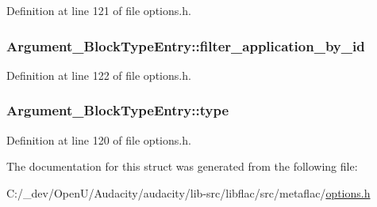 Definition at line 121 of file options.\+h.

\subsubsection[{\texorpdfstring{filter\+\_\+application\+\_\+by\+\_\+id}{filter_application_by_id}}]{ Argument\+\_\+\+Block\+Type\+Entry\+::filter\+\_\+application\+\_\+by\+\_\+id}\hypertarget{struct_argument___block_type_entry_a2f5545e19f56a9e4418a88ad112044fd}{}\label{struct_argument___block_type_entry_a2f5545e19f56a9e4418a88ad112044fd}


Definition at line 122 of file options.\+h.

\subsubsection[{\texorpdfstring{type}{type}}]{ Argument\+\_\+\+Block\+Type\+Entry\+::type}\hypertarget{struct_argument___block_type_entry_ad3ff44029f5edfa7acc20616b7e1a9a0}{}\label{struct_argument___block_type_entry_ad3ff44029f5edfa7acc20616b7e1a9a0}


Definition at line 120 of file options.\+h.



The documentation for this struct was generated from the following file\+:\begin{DoxyCompactItemize}
\item 
C\+:/\+\_\+dev/\+Open\+U/\+Audacity/audacity/lib-\/src/libflac/src/metaflac/\hyperlink{libflac_2src_2metaflac_2options_8h}{options.\+h}\end{DoxyCompactItemize}
